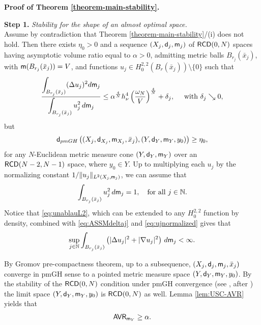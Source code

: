 \documentclass[11pt, reqno]{amsart}
\numberwithin{equation}{section}
\begin{document}
	
	\textbf{Proof of  Theorem \ref{theorem-main-stability}.}
 \smallskip
 
 
 \textbf{Step 1.} \textit{Stability for the shape of an almost optimal space.}
\\	Assume by contradiction that Theorem \ref{theorem-main-stability}/(i) does not hold. Then there exists $\eta_{0}>0$ and  a sequence $(X_{j}, {\sf d}_{j}, {\sf m}_{j})$ of ${\sf RCD}(0,N)$ spaces having asymptotic volume ratio equal to $\alpha>0$, admitting metric balls $B_{r_{j}}(\bar x_{j})$, with ${\sf m} (B_{r_j}(\bar x_j))=V$,  and functions $u_{j} \in H^{2,2}_{0} (B_{r}(\bar x_{j}))\setminus \{0\}$ such that 
	\begin{equation}\label{eq:ASSMdeltaj}
		\frac{\displaystyle\int_{B_{r_{j}}(\bar x_{j})} (\Delta u_{j})^2 {\rm d}{\sf m}_{j}}{\displaystyle\int_{B_{r_{j}}(\bar x_{j})} u_{j}^2 \, {\rm d}{\sf m}_{j}} \leq \alpha^\frac{4}{N} h_\nu^4 \left(\frac{\omega_N}{V} \right)^\frac{4}{N} + \delta_{j}, \quad \text{ with } \delta_{j}\searrow 0, 
		\end{equation}
		but 
		\begin{equation}\label{eq:Thesiseta0}
		 {\sf d}_{\rm pmGH}\left( (X_j, {\sf d}_{X_j}, {\sf m}_{X_j}, \bar x_j), (Y, {\sf d}_{Y}, {\sf m}_{Y}, y_{0})  \right)\geq \eta_{0},
		\end{equation}
		for any $N$-Euclidean metric measure cone $(Y, {\sf d}_{Y}, {\sf m}_{Y})$ over an ${\sf RCD}(N-2,N-1)$ space, where  $y_{0}\in Y$. Up to multiplying each $u_j$ by the normalizing constant $1/\|u_j\|_{L^2(X_j, {\sf m}_j)}$, we can assume that 
		\begin{equation}\label{eq:ujnormalized}
		\int_{B_{r_{j}}(\bar x_{j})} u_{j}^2 \, {\rm d}{\sf m}_{j} =1, \quad \text{for all }j\in \mathbb{N}.
		\end{equation}
		Notice that \eqref{eq:unablauL2}, which can be extended to any $H^{2,2}_{0}$ function by density, combined with \eqref{eq:ASSMdeltaj} and \eqref{eq:ujnormalized} gives that
		\begin{equation}\label{eq:ujBDDW12}
		\sup_{j\in \mathbb{N}} \int_{B_{r_{j}}(\bar x_{j})} \left( |\Delta u_j|^2 +  |\nabla u_{j}|^2 \right) \, {\rm d}{\sf m}_{j} <\infty. 	
		\end{equation}
		
		By Gromov pre-compactness theorem,  up to a subsequence,    $(X_{j}, {\sf d}_{j}, {\sf m}_{j}, \bar{x}_{j})$ converge in pmGH sense  to a pointed  metric measure space $(Y, {\sf d}_{Y}, {\sf m}_{Y}, y_{0})$. By the stability of the ${\sf RCD}(0,N)$ condition under pmGH convergence (see \cite{GMS}, after \cite{Sturm-2, LV,  Villani,  AGS2}) the limit space $(Y, {\sf d}_{Y}, {\sf m}_{Y}, y_{0})$ is ${\sf RCD}(0,N)$ as well.  Lemma \ref{lem:USC-AVR} yields that
		\begin{equation}\label{eq:USCAVR}
		{\sf AVR}_{{\sf m}_Y}\geq \alpha.
		\end{equation}
		
\end{document}
